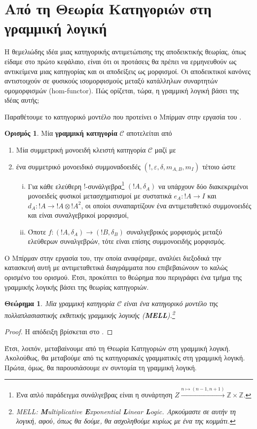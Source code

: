 \documentclass [a4paper,11pt] {book}
\newtheorem{theorema}[theorem]{Θεώρημα}
\theoremstyle{definition}
\theoremstyle{definition}
\newtheorem{definition}[theorem]{Ορισμός}
\begin{document}
\section{Από τη Θεωρία Κατηγοριών στη γραμμική λογική}
Η θεμελιώδης ιδέα μιας κατηγορικής αντιμετώπισης της αποδεικτικής θεωρίας, όπως είδαμε στο πρώτο κεφάλαιο, είναι ότι οι προτάσεις θα πρέπει να ερμηνευθούν ως αντικείμενα μιας κατηγορίας και οι αποδείξεις ως μορφισμοί. Οι αποδεικτικοί κανόνες αντιστοιχούν σε φυσικούς ισομορφισμούς μεταξύ κατάλληλων συναρτητών ομομορφισμών (hom-functor). Πώς ορίζεται, τώρα, η γραμμική λογική βάσει της ιδέας αυτής;

Παραθέτουμε το κατηγορικό μοντέλο που προτείνει ο Μπίρμαν στην εργασία του \citep{Bierman95whatis}.
\begin{definition}
Μία \textbf{γραμμική κατηγορία} $\mathcal{C}$ αποτελείται από
\begin{enumerate}
\item Μία συμμετρική μονοειδή κλειστή κατηγορία $\mathcal{C}$ μαζί με
\item ένα συμμετρικό μονοειδικό συμμοναδοειδές $(!,\varepsilon ,\delta ,m_{A,B},m_{I})$ τέτοιο ώστε
\begin{enumerate}[(i)]
\item Για κάθε ελεύθερη $!$-συνάλγεβρα\footnote{Ένα απλό παράδειγμα συνάλγεβρας είναι η συνάρτηση ${Z}\xrightarrow {n\mapsto (n-1,n+1)}\mathbb{Z}\times \mathbb{Z}$.} $(!A,\delta_{A})$ να υπάρχουν δύο διακεκριμένοι μονοειδείς φυσικοί μετασχηματισμοί με συστατικά $e_{A}:!A\to I$ και $d_{A}:!A\to !A\otimes !A^{2}$, οι οποίοι συναπαρτίζουν ένα αντιμεταθετικό συμμονοειδές και είναι συναλγεβρικοί μορφισμοί,
\item Όποτε $f:(!A,\delta_{A})\to(!B,\delta_{B})$ συναλγεβρικός μορφισμός μεταξύ ελεύθερων συναλγεβρών, τότε είναι επίσης συμμονοειδής μορφισμός.
\end{enumerate}
\end{enumerate}
\end{definition}
Ο Μπίρμαν στην εργασία του, την οποία αναφέραμε, αναλύει διεξοδικά την κατασκευή αυτή με αντιμεταθετικά διαγράμματα που επιβεβαιώνουν το καλώς ορισμένο του ορισμού. Έτσι, προκύπτει το θεώρημα που περιγράφει ένα τμήμα της γραμμικής λογικής βάσει της θεωρίας κατηγοριών.
\begin{theorema}
Μία γραμμική κατηγορία $\mathcal{C}$ είναι ένα κατηγορικό μοντέλο της πολλαπλασιαστικής εκθετικής γραμμικής λογικής (\textbf{MELL}).\footnote{MELL: \textbf{M}ultiplicative \textbf{E}xponential \textbf{L}inear \textbf{L}ogic. Αρκούμαστε σε αυτήν τη λογική, αφού, όπως θα δούμε, θα ασχοληθούμε κυρίως με ένα της κομμάτι.}
\end{theorema}
\begin{proof}
Η απόδειξη βρίσκεται στο \citep{Bierman95whatis}.
\end{proof}
Έτσι, λοιπόν, μεταβαίνουμε από τη Θεωρία Κατηγοριών στη γραμμική λογική. Ακολούθως, θα μεταβούμε από τις κατηγοριακές γραμματικές στη γραμμική λογική. Πρώτα, όμως, θα παρουσιάσουμε εν συντομία τη γραμμική λογική.
\end{document}
